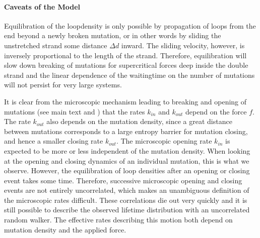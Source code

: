 \paragraph{Caveats of the Model}
Equilibration of the loopdensity is only possible by propagation of loops from the end beyond a newly broken mutation, or in other words by sliding the unstretched strand some distance $\Delta d$ inward. The sliding velocity, however,  is inversely proportional to the length of the strand. Therefore, equilibration will slow down breaking of mutations for supercritical forces deep inside the double strand and the linear dependence of the waitingtime on the number of mutations  will not persist for very large systems.

It is clear from the microscopic mechanism leading to breaking and opening of mutations (see main text and ) that the rates $k_{in}$ and 
$k_{out}$ depend on the force $f$. The rate $k_{out}$ also depends on the mutation density, since a great distance between mutations corresponds to a large entropy barrier for mutation closing, and hence a smaller closing rate $k_{out}$. The microscopic opening rate $k_{in}$ is expected to be more or less independent of the mutation density. When looking at the opening and closing dynamics of an individual mutation, this is what we observe.
However, the equilibration of loop densities after an opening or closing event takes some time. Therefore, successive microscopic opening and closing events are not entirely uncorrelated, which makes an unambiguous definition of the microscopic rates difficult. These correlations die out very quickly and it is still possible to describe the observed lifetime distribution with an uncorrelated random walker. The effective rates describing this motion both depend on mutation density and the applied force.

